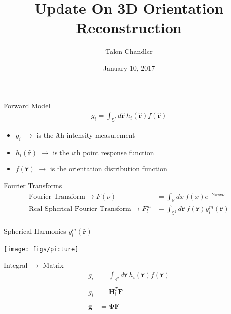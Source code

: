 \documentclass[presentation]{beamer}
\author{Talon Chandler}
\date{January 10, 2017}
\title{Update On 3D Orientation Reconstruction}
\begin{document}
\maketitle
\begin{frame}[label=sec-1]{Forward Model}
\begin{align*}
g_i = \int_{\mathbb{S}^2}d\hat{\textbf{r}}\ h_i(\hat{\textbf{r}})f(\hat{\textbf{r}})
\end{align*}
\begin{itemize}
\item $g_i$ $\rightarrow$ is the $i$th intensity measurement
\item $h_i(\hat{\textbf{r}})$ $\rightarrow$ is the $i$th point response function
\item $f(\hat{\textbf{r}})$ $\rightarrow$ is the orientation distribution function
\end{itemize}
\end{frame}

\begin{frame}[label=sec-2]{Fourier Transforms}
\begin{align*}
\text{Fourier Transform} \rightarrow F(\nu) &= \int_{\mathbb{R}}dx\ f(x)e^{-2\pi i x\nu}\\
\text{Real Spherical Fourier Transform} \rightarrow F_l^m &= \int_{\mathbb{S}^2}d\hat{\textbf{r}}\ f(\hat{\textbf{r}})y_l^m(\hat{\textbf{r}})\\
\end{align*}
\end{frame}

\begin{frame}{Spherical Harmonics $y_l^m(\mathbf{\hat{r}})$}
\begin{center}
  \texttt{[image: figs/picture]}
\end{center}
\end{frame}

\begin{frame}{Integral $\rightarrow$ Matrix}
  \begin{align*}
  g_i &= \int_{\mathbb{S}^2}d\hat{\textbf{r}}\ h_i(\hat{\textbf{r}})f(\hat{\textbf{r}})\\ \\
  g_i &= \textbf{H}_i^T\textbf{F}\\ \\
  \mathbf{g} &= \mathbf{\Psi}\textbf{F}
  \end{align*}
\end{frame}
\end{document}
